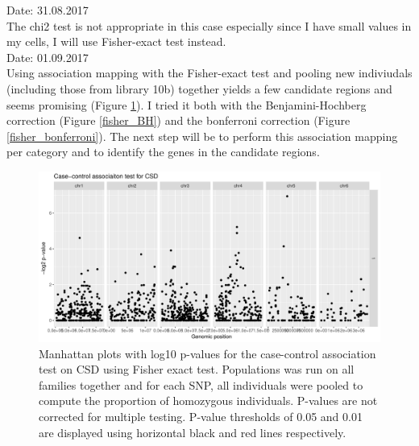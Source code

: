 \documentclass[10pt,a4paper]{report}
\begin{document}
Date: 31.08.2017\\
The chi2 test is not appropriate in this case especially since I have small values in my cells, I will use Fisher-exact test instead.\\
Date: 01.09.2017\\
Using association mapping with the Fisher-exact test and pooling new indiviudals (including those from library 10b) together yields a few candidate regions and seems promising (Figure \ref{assoc_fisher}). I tried it both with the Benjamini-Hochberg correction (Figure \ref{fisher_BH}) and the bonferroni correction (Figure \ref{fisher_bonferroni}). The next step will be to perform this association mapping per category and to identify the genes in the candidate regions.

\begin{figure}[h]
	\begin{center}
		\includegraphics[width=\textwidth]{association_mapping/fisher_no_corr.pdf}
		\caption{Manhattan plots with log10 p-values for the case-control association test on CSD using Fisher exact test. Populations was run on all families together and for each SNP, all individuals were pooled to compute the proportion of homozygous individuals. P-values are not corrected for multiple testing. P-value thresholds of 0.05 and 0.01 are displayed using horizontal black and red lines respectively.}
		\label{assoc_fisher}
	\end{center}
\end{figure}
\end{document}
